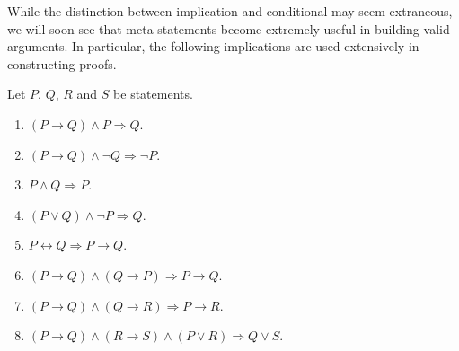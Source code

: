 While the distinction between implication and conditional may seem extraneous, we will soon see that meta-statements become extremely useful in building valid arguments.
In particular, the following implications are used extensively in constructing proofs.
\begin{fact}
Let $P$, $Q$, $R$ and $S$ be statements.
\begin{enumerate}
\item $(P \rightarrow Q) \wedge P \Rightarrow Q$.
\item $(P \rightarrow Q) \wedge \neg Q \Rightarrow \neg P$.
\item $P \wedge Q \Rightarrow P$.
\item $(P \vee Q) \wedge \neg P \Rightarrow Q$.
\item $P \leftrightarrow Q \Rightarrow P \rightarrow Q$.
\item $(P \rightarrow Q) \wedge (Q \rightarrow P) \Rightarrow P \rightarrow Q$.

\item $(P \rightarrow Q) \wedge (Q \rightarrow R) \Rightarrow P \rightarrow R$.

\item $(P \rightarrow Q) \wedge (R \rightarrow S) \wedge (P \vee R) \Rightarrow Q \vee S$.
\end{enumerate}
\end{fact}

